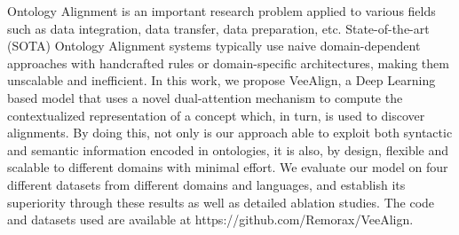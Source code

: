 Ontology Alignment is an important research problem applied to various fields such as data integration, data transfer, data preparation, etc. State-of-the-art (SOTA) Ontology Alignment systems typically use naive domain-dependent approaches with handcrafted rules or domain-specific architectures, making them unscalable and inefficient. In this work, we propose VeeAlign, a Deep Learning based model that uses a novel dual-attention mechanism to compute the contextualized representation of a concept which, in turn,  is used to discover alignments. By doing this, not only is our approach able to exploit both syntactic and semantic information encoded in ontologies, it is also, by design, flexible and scalable to different domains with minimal effort. We evaluate our model on four different datasets from different domains and languages, and  establish its superiority through these results as well as detailed ablation studies. The code and datasets used are available at https://github.com/Remorax/VeeAlign.
